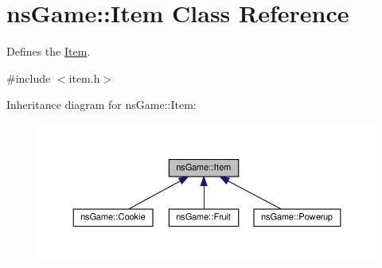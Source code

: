 \hypertarget{structns_game_1_1_item}{}\section{ns\+Game\+:\+:Item Class Reference}
\label{structns_game_1_1_item}


Defines the \hyperlink{structns_game_1_1_item}{Item}.  




{\ttfamily \#include $<$item.\+h$>$}



Inheritance diagram for ns\+Game\+:\+:Item\+:\nopagebreak
\begin{figure}[H]
\begin{center}
\leavevmode
\includegraphics[width=350pt]{structns_game_1_1_item__inherit__graph}
\end{center}
\end{figure}
